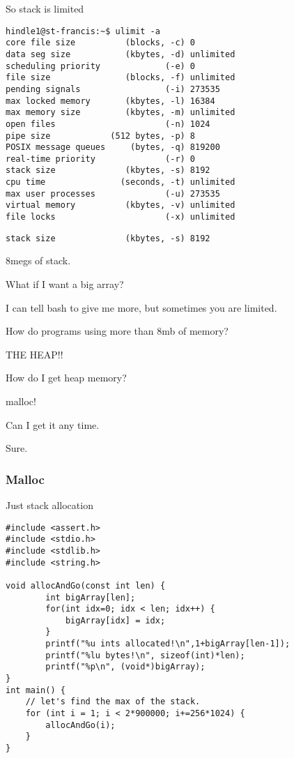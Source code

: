 \documentclass[11pt]{article}
\begin{document}
So stack is limited

\begin{verbatim}
hindle1@st-francis:~$ ulimit -a
core file size          (blocks, -c) 0
data seg size           (kbytes, -d) unlimited
scheduling priority             (-e) 0
file size               (blocks, -f) unlimited
pending signals                 (-i) 273535
max locked memory       (kbytes, -l) 16384
max memory size         (kbytes, -m) unlimited
open files                      (-n) 1024
pipe size            (512 bytes, -p) 8
POSIX message queues     (bytes, -q) 819200
real-time priority              (-r) 0
stack size              (kbytes, -s) 8192
cpu time               (seconds, -t) unlimited
max user processes              (-u) 273535
virtual memory          (kbytes, -v) unlimited
file locks                      (-x) unlimited
\end{verbatim}


\begin{verbatim}
stack size              (kbytes, -s) 8192
\end{verbatim}

8megs of stack.

What if I want a big array?

I can tell bash to give me more, but sometimes you are limited.

How do programs using more than 8mb of memory?

THE HEAP!!

How do I get heap memory?

malloc!

Can I get it any time.

Sure.

\subsubsection{Malloc}
\label{sec:orgc993982}

Just stack allocation
\begin{verbatim}
#include <assert.h>
#include <stdio.h>
#include <stdlib.h>
#include <string.h>

void allocAndGo(const int len) {
        int bigArray[len];
        for(int idx=0; idx < len; idx++) {
            bigArray[idx] = idx;
        }
        printf("%u ints allocated!\n",1+bigArray[len-1]);
        printf("%lu bytes!\n", sizeof(int)*len);
        printf("%p\n", (void*)bigArray);
}
int main() {
    // let's find the max of the stack.
    for (int i = 1; i < 2*900000; i+=256*1024) {
        allocAndGo(i);
    }
}
\end{verbatim}
\end{document}
